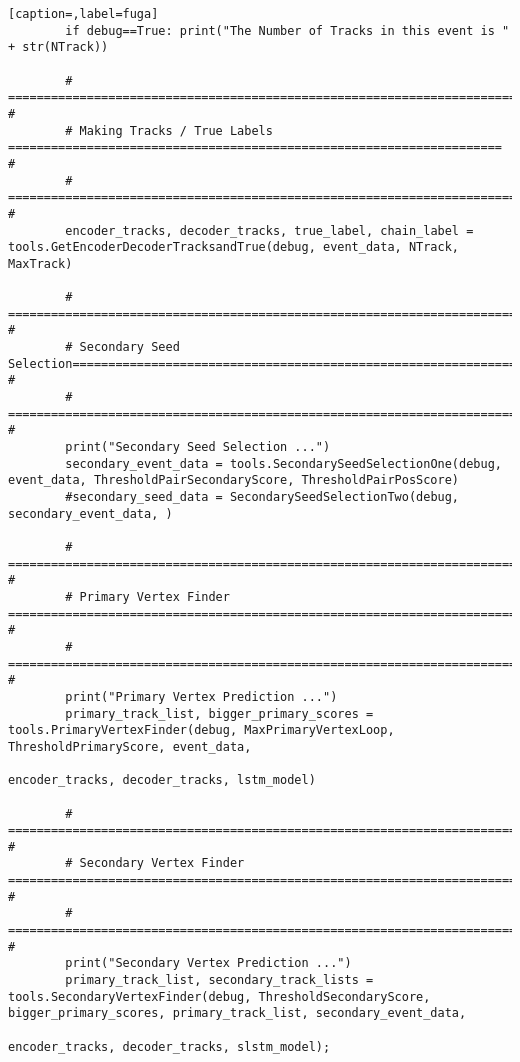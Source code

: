 \begin{lstlisting}[caption=,label=fuga]
        if debug==True: print("The Number of Tracks in this event is " + str(NTrack))

        # ================================================================================================= #
        # Making Tracks / True Labels ===================================================================== #
        # ================================================================================================= #
        encoder_tracks, decoder_tracks, true_label, chain_label = tools.GetEncoderDecoderTracksandTrue(debug, event_data, NTrack, MaxTrack)

        # ================================================================================================= #
        # Secondary Seed Selection========================================================================= #
        # ================================================================================================= #
        print("Secondary Seed Selection ...")
        secondary_event_data = tools.SecondarySeedSelectionOne(debug, event_data, ThresholdPairSecondaryScore, ThresholdPairPosScore)
        #secondary_seed_data = SecondarySeedSelectionTwo(debug, secondary_event_data, )

        # ================================================================================================= #
        # Primary Vertex Finder =========================================================================== #
        # ================================================================================================= #
        print("Primary Vertex Prediction ...")
        primary_track_list, bigger_primary_scores = tools.PrimaryVertexFinder(debug, MaxPrimaryVertexLoop, ThresholdPrimaryScore, event_data,
		                                                              encoder_tracks, decoder_tracks, lstm_model)

        # ================================================================================================= #
        # Secondary Vertex Finder ========================================================================= #
        # ================================================================================================= #
        print("Secondary Vertex Prediction ...")
        primary_track_list, secondary_track_lists = tools.SecondaryVertexFinder(debug, ThresholdSecondaryScore, bigger_primary_scores, primary_track_list, secondary_event_data, 
                                                                                encoder_tracks, decoder_tracks, slstm_model);


\end{lstlisting}
